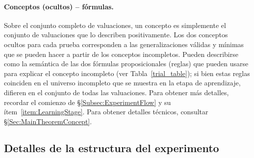 \paragraph{Conceptos (ocultos) -- fórmulas.}
Sobre el conjunto completo de valuaciones, un concepto es simplemente el conjunto de valuaciones que lo describen positivamente. Los dos conceptos ocultos para cada prueba corresponden a las generalizaciones válidas y mínimas que se pueden hacer a partir de los conceptos incompletos. Pueden describirse como la semántica de las dos fórmulas proposicionales (reglas) que pueden usarse para explicar el concepto incompleto (ver Tabla~\ref{trial_table}); si bien estas reglas coinciden en el universo incompleto que se muestra en la etapa de aprendizaje, difieren en el conjunto de todas las valuaciones. Para obtener más detalles, recordar el comienzo de \S\ref{Subsec:ExperimentFlow} y su ítem~\ref{item:LearningStage}. Para obtener detalles técnicos, consultar \S\ref{Sec:MainTheoremConcept}.

\bigskip




\subsection{Detalles de la estructura del experimento} \label{FullExperimentDescription} 

